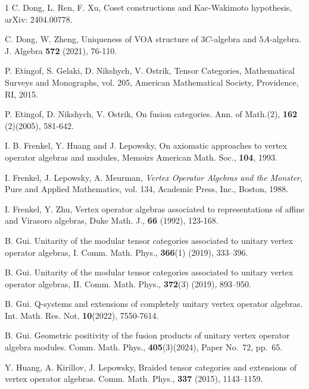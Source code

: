 \documentclass{article}
\begin{document}
\begin{thebibliography}{1}
	 C. Dong, L. Ren, F. Xu, Coset constructions and Kac-Wakimoto hypothesis,  arXiv: 2404.00778.
	
	 C. Dong, W. Zheng, Uniqueness of VOA structure of $3C$-algebra and
	$5A$-algebra. J. Algebra
	\textbf{572 }(2021), 76-110.
	
	P. Etingof, S. Gelaki, D. Nikshych, V. Ostrik, Tensor Categories, Mathematical Surveys and Monographs, vol. 205, American Mathematical Society, Providence, RI, 2015.
	
	P. Etingof, D. Nikshych, V. Ostrik, On fusion categories. Ann. of Math.(2), \textbf{162 }(2)(2005), 581-642.
	
	 I. B. Frenkel, Y. Huang and J. Lepowsky, On
	axiomatic approaches to vertex operator algebras and modules,
	Memoirs American Math. Soc., {\bf 104}, 1993.
	
	I. Frenkel, J. Lepowsky, A. Meurman, \emph{Vertex Operator Algebras and the Monster},
	Pure and Applied Mathematics, {vol. 134}, Academic Press, Inc., Boston, 1988.
	
	 I. Frenkel, Y. Zhu,  Vertex operator algebras associated to representations of affine and Virasoro algebras,
	Duke Math. J., \textbf{66} (1992), 123-168.
	
	B. Gui.
	Unitarity of the modular tensor categories associated to unitary vertex operator algebras, I.
	Comm. Math. Phys.,
	\textbf{366}(1) (2019), 333--396.
	
	B. Gui.
	Unitarity of the modular tensor categories associated to unitary vertex operator algebras, II.
	Comm. Math. Phys.,
	\textbf{372}(3) (2019), 893--950.
	
	B. Gui.
	Q-systems and extensions of completely unitary vertex operator algebras.
	Int. Math. Res. Not,
	\textbf{10}(2022), 7550-7614.
	
	B. Gui.
	Geometric positivity of the fusion products of unitary vertex operator algebra modules.
	Comm. Math. Phys.,
	\textbf{405}(3)(2024), Paper No.\ 72, pp.\ 65.
	
	
	
	
	Y. Huang, A. Kirillov, J. Lepowsky, Braided tensor categories and extensions of vertex operator algebras. Comm. Math. Phys.,
	\textbf{337} (2015), 1143--1159.
	

\end{thebibliography}
\end{document}

